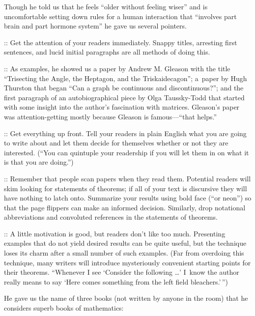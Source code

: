 Though he told us that he feels ``older without feeling wiser'' and is
uncomfortable setting down rules for a human interaction that ``involves
part brain and part hormone system'' he gave us several pointers.

\smallskip
\display 30pt::
{\cm Get the attention of your readers immediately.}  Snappy titles, arresting
    first sentences, and lucid initial paragraphs are all methods of doing
    this.  
    
\smallskip
\display 30pt::
    As examples, he showed us a paper by Andrew M. Gleason with the title
   ``Trisecting the Angle, the Heptagon, and the Triskaidecagon''; a~paper by
    Hugh Thurston that began ``Can a graph be continuous and discontinuous?'';
    and the first paragraph of an 
autobiographical piece by Olga Taussky-Todd
    that started with some insight into the author's fascination with matrices.
Gleason's paper was attention-getting mostly because Gleason is famous---``that
helps.''
    
\smallskip
\display 30pt::
{\cm Get everything up front.}  Tell your readers in plain English what you are
    going to write about and let them decide for themselves whether or not
    they are interested.  (``You can quintuple your readership if you will let
    them in on what it is that you are doing.'')
    
\smallskip
\display 30pt::
{\cm Remember that people scan papers when they read them.}  Potential readers
    will skim looking for statements of theorems; if all of your text is
    discursive they will have nothing to latch onto.  Summarize your results
    using bold face (``or neon'') so that the page flippers can make an informed
    decision.  Similarly, drop notational abbreviations and convoluted
    references in the statements of theorems.
    
\smallskip
\display 30pt::
{\cm A little motivation is good, but readers don't like too much.}
    Presenting examples that do not yield desired results can be quite useful,
    but the technique loses its charm after a  small number of such examples.
    (Far from overdoing this technique, many writers will introduce 
    mysteriously convenient starting points for their theorems.  ``Whenever 
    I see `Consider the following \dots' I~know the author really means
    to say `Here comes something from the left field bleachers.'$\,$'')

\smallskip
He gave us the name of three books (not written by anyone in the room)
that he considers superb books of mathematics:
    
